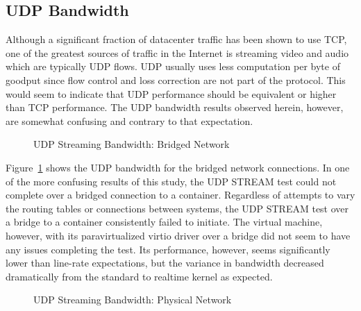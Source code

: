 \subsection{UDP Bandwidth} %
\label{sub:udpbandwidth}
Although a significant fraction of datacenter traffic has been shown to use TCP, one of the greatest sources of traffic in the Internet is streaming video and audio which are typically UDP flows.
UDP usually uses less computation per byte of goodput since flow control and loss correction are not part of the protocol.  
This would seem to indicate that UDP performance should be equivalent or higher than TCP performance.  
The UDP bandwidth results observed herein, however, are somewhat confusing and contrary to that expectation.

\begin{figure}
    \centering
    \def\svgwidth{\columnwidth}
    
    \caption{UDP Streaming Bandwidth: Bridged Network}
    \label{fig:udp_stream_bridge}
\end{figure}
Figure~\ref{fig:udp_stream_bridge} shows the UDP bandwidth for the bridged network connections.  
In one of the more confusing results of this study, the UDP STREAM test could not complete over a bridged connection to a container.
Regardless of attempts to vary the routing tables or connections between systems, the UDP STREAM test over a bridge to a container consistently failed to initiate.
The virtual machine, however, with its paravirtualized virtio driver over a bridge did not seem to have any issues completing the test.  
Its performance, however, seems significantly lower than line-rate expectations, but the variance in bandwidth decreased dramatically from the standard to realtime kernel as expected.  

\begin{figure}
    \centering
    \def\svgwidth{\columnwidth}
    
    \caption{UDP Streaming Bandwidth: Physical Network}
    \label{fig:udp_stream_phys}
\end{figure}

